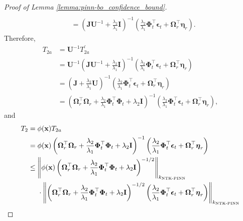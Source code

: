 \begin{proof}[Proof of Lemma \ref{lemma:pinn-bo_confidence_bound}]
\begin{align*}
\\
       & = \left(\mathbf{J}\mathbf{U}^{-1}  + \frac{\lambda_2}{\lambda_1}\mathbf{I} \right)^{-1} \left(\frac{\lambda_2}{\lambda_1}\boldsymbol{\Phi}_t^\top \boldsymbol{\epsilon}_t + \boldsymbol{\Omega}_r^\top \boldsymbol{\eta}_r \right).
   \end{align*}
    Therefore, 
    \begin{align*}
            T_{2a} &= \mathbf{U}^{-1}  T_{2a}^\prime \\ 
            &= \mathbf{U}^{-1}\left(\mathbf{J}\mathbf{U}^{-1}  + \frac{\lambda_2}{\lambda_1}\mathbf{I} \right)^{-1} \left(\frac{\lambda_2}{\lambda_1}\boldsymbol{\Phi}_t^\top \boldsymbol{\epsilon}_t + \boldsymbol{\Omega}_r^\top \boldsymbol{\eta}_r \right) 
\\
            & = \left(\mathbf{J} + \frac{\lambda_2}{\lambda_1}\mathbf{U} \right)^{-1} \left(\frac{\lambda_2}{\lambda_1}\boldsymbol{\Phi}_t^\top \boldsymbol{\epsilon}_t + \boldsymbol{\Omega}_r^\top \boldsymbol{\eta}_r \right) 
\\
            & = \left(\boldsymbol{\Omega}_r^\top \boldsymbol{\Omega}_r + \frac{\lambda_2}{\lambda_1}\boldsymbol{\Phi}_t^\top\boldsymbol{\Phi}_t + \lambda_2\mathbf{I}\right)^{-1}\left(\frac{\lambda_2}{\lambda_1}\boldsymbol{\Phi}_t^\top \boldsymbol{\epsilon}_t + \boldsymbol{\Omega}_r^\top \boldsymbol{\eta}_r \right),
    \end{align*}
    and 
    \begin{align*} 
            T_2 &= \phi(\mathbf{x}) T_{2a} 
            \\
                & = \phi(\mathbf{x})\left(\boldsymbol{\Omega}_r^\top \boldsymbol{\Omega}_r + \frac{\lambda_2}{\lambda_1}\boldsymbol{\Phi}_t^\top\boldsymbol{\Phi}_t + \lambda_2\mathbf{I}\right)^{-1}\left(\frac{\lambda_2}{\lambda_1}\boldsymbol{\Phi}_t^\top \boldsymbol{\epsilon}_t + \boldsymbol{\Omega}_r^\top \boldsymbol{\eta}_r \right)
            \\
                & \le  \norm{\phi(\mathbf{x}) \left(\boldsymbol{\Omega}_r^\top \boldsymbol{\Omega}_r + \frac{\lambda_2}{\lambda_1}\boldsymbol{\Phi}_t^\top\boldsymbol{\Phi}_t + \lambda_2\mathbf{I}\right)^{-1/2}}_{k_\textup{NTK-PINN}} \notag 
\\
                & \;\;\;\;\; \cdot \norm{\left(\boldsymbol{\Omega}_r^\top \boldsymbol{\Omega}_r + \frac{\lambda_2}{\lambda_1}\boldsymbol{\Phi}_t^\top\boldsymbol{\Phi}_t + \lambda_2\mathbf{I}\right)^{-1/2}\left(\frac{\lambda_2}{\lambda_1}\boldsymbol{\Phi}_t^\top \boldsymbol{\epsilon}_t + \boldsymbol{\Omega}_r^\top \boldsymbol{\eta}_r \right)}_{k_\textup{NTK-PINN}}

\end{align*}
\end{proof}
